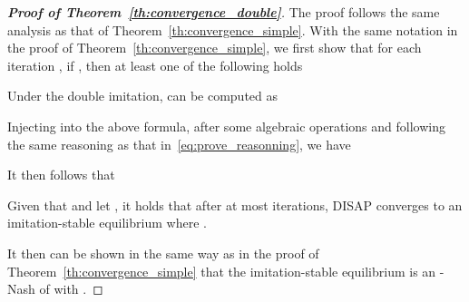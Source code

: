\documentclass[12pt, onecolumn]{IEEEtran}
\theoremstyle{plain}
\theoremstyle{definition}
\begin{document}
\begin{proof}[\textbf{Proof of Theorem~\ref{th:convergence_double}}]

The proof follows the same analysis as that of Theorem~\ref{th:convergence_simple}. With the same notation in the proof of Theorem~\ref{th:convergence_simple}, we first show that for each iteration , if , then at least one of the following holds


Under the double imitation,  can be computed as


Injecting  into the above formula, after some algebraic operations and following the same reasoning as that in~\eqref{eq:prove_reasonning}, we have


It then follows that


Given that  and let , it holds that after at most  iterations, DISAP converges to an imitation-stable equilibrium where .

It then can be shown in the same way as in the proof of Theorem~\ref{th:convergence_simple} that the imitation-stable equilibrium is an -Nash of  with .
\end{proof}
\end{document}
